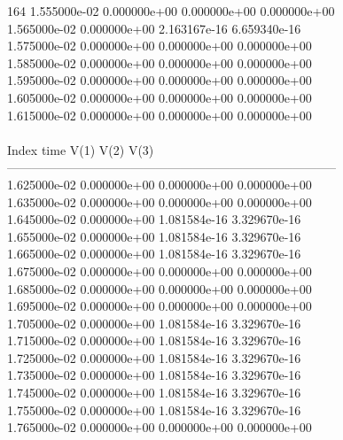 164	1.555000e-02	0.000000e+00	0.000000e+00	0.000000e+00	\\ 	1.565000e-02	0.000000e+00	2.163167e-16	6.659340e-16	\\ 	1.575000e-02	0.000000e+00	0.000000e+00	0.000000e+00	\\ 	1.585000e-02	0.000000e+00	0.000000e+00	0.000000e+00	\\ 	1.595000e-02	0.000000e+00	0.000000e+00	0.000000e+00	\\ 	1.605000e-02	0.000000e+00	0.000000e+00	0.000000e+00	\\ 	1.615000e-02	0.000000e+00	0.000000e+00	0.000000e+00	\\ \hline
\\ \hline
Index   time            V(1)            V(2)            V(3)            \\ \hline
--------------------------------------------------------------------------------\\ 	1.625000e-02	0.000000e+00	0.000000e+00	0.000000e+00	\\ 	1.635000e-02	0.000000e+00	0.000000e+00	0.000000e+00	\\ 	1.645000e-02	0.000000e+00	1.081584e-16	3.329670e-16	\\ 	1.655000e-02	0.000000e+00	1.081584e-16	3.329670e-16	\\ 	1.665000e-02	0.000000e+00	1.081584e-16	3.329670e-16	\\ 	1.675000e-02	0.000000e+00	0.000000e+00	0.000000e+00	\\ 	1.685000e-02	0.000000e+00	0.000000e+00	0.000000e+00	\\ 	1.695000e-02	0.000000e+00	0.000000e+00	0.000000e+00	\\ 	1.705000e-02	0.000000e+00	1.081584e-16	3.329670e-16	\\ 	1.715000e-02	0.000000e+00	1.081584e-16	3.329670e-16	\\ 	1.725000e-02	0.000000e+00	1.081584e-16	3.329670e-16	\\ 	1.735000e-02	0.000000e+00	1.081584e-16	3.329670e-16	\\ 	1.745000e-02	0.000000e+00	1.081584e-16	3.329670e-16	\\ 	1.755000e-02	0.000000e+00	1.081584e-16	3.329670e-16	\\ 	1.765000e-02	0.000000e+00	0.000000e+00	0.000000e+00	\\ \hline
